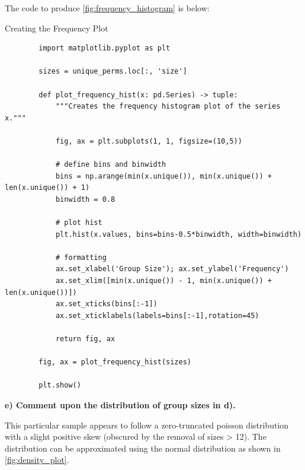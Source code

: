 \documentclass{article}
\begin{document}
The code to produce \cref{fig:frequency_histogram} is below:
\begin{mybox}[colbacktitle=green]{Creating the Frequency Plot}
    \begin{verbatim}
        import matplotlib.pyplot as plt

        sizes = unique_perms.loc[:, 'size']

        def plot_frequency_hist(x: pd.Series) -> tuple:
            """Creates the frequency histogram plot of the series x.""" 

            fig, ax = plt.subplots(1, 1, figsize=(10,5))

            # define bins and binwidth
            bins = np.arange(min(x.unique()), min(x.unique()) + len(x.unique()) + 1)
            binwidth = 0.8

            # plot hist
            plt.hist(x.values, bins=bins-0.5*binwidth, width=binwidth)

            # formatting
            ax.set_xlabel('Group Size'); ax.set_ylabel('Frequency')
            ax.set_xlim([min(x.unique()) - 1, min(x.unique()) + len(x.unique())])
            ax.set_xticks(bins[:-1])
            ax.set_xticklabels(labels=bins[:-1],rotation=45)

            return fig, ax

        fig, ax = plot_frequency_hist(sizes)

        plt.show()
    \end{verbatim}
\end{mybox}

\newpage

\textbf{e) Comment upon the distribution of group sizes in d). }

\vspace{\baselineskip}

This particular sample appears to follow a zero-truncated poisson distribution with a slight positive skew (obscured by the removal of sizes > 12). The distribution can be approximated using the normal distribution as shown in \cref{fig:density_plot}. 
\end{document}

